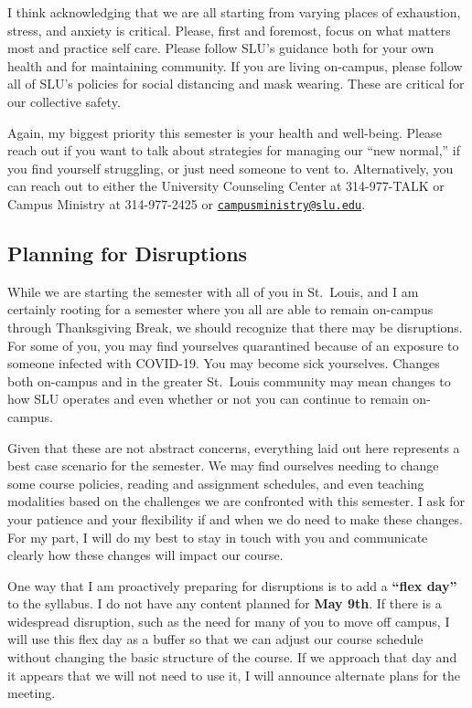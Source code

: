 \documentclass[
]{book}
\begin{document}
I think acknowledging that we are all starting from varying places of exhaustion, stress, and anxiety is critical. Please, first and foremost, focus on what matters most and practice self care. Please follow SLU's guidance both for your own health and for maintaining community. If you are living on-campus, please follow all of SLU's policies for social distancing and mask wearing. These are critical for our collective safety.

Again, my biggest priority this semester is your health and well-being. Please reach out if you want to talk about strategies for managing our ``new normal,'' if you find yourself struggling, or just need someone to vent to. Alternatively, you can reach out to either the University Counseling Center at 314-977-TALK or Campus Ministry at 314-977-2425 or \href{mailto:campusministry@slu.edu}{\nolinkurl{campusministry@slu.edu}}.

\hypertarget{planning-for-disruptions}{%
\subsection{Planning for Disruptions}\label{planning-for-disruptions}}

While we are starting the semester with all of you in St.~Louis, and I am certainly rooting for a semester where you all are able to remain on-campus through Thanksgiving Break, we should recognize that there may be disruptions. For some of you, you may find yourselves quarantined because of an exposure to someone infected with COVID-19. You may become sick yourselves. Changes both on-campus and in the greater St.~Louis community may mean changes to how SLU operates and even whether or not you can continue to remain on-campus.

Given that these are not abstract concerns, everything laid out here represents a best case scenario for the semester. We may find ourselves needing to change some course policies, reading and assignment schedules, and even teaching modalities based on the challenges we are confronted with this semester. I ask for your patience and your flexibility if and when we do need to make these changes. For my part, I will do my best to stay in touch with you and communicate clearly how these changes will impact our course.

One way that I am proactively preparing for disruptions is to add a \textbf{``flex day''} to the syllabus. I do not have any content planned for \textbf{May 9th}. If there is a widespread disruption, such as the need for many of you to move off campus, I will use this flex day as a buffer so that we can adjust our course schedule without changing the basic structure of the course. If we approach that day and it appears that we will not need to use it, I will announce alternate plans for the meeting.
\end{document}
